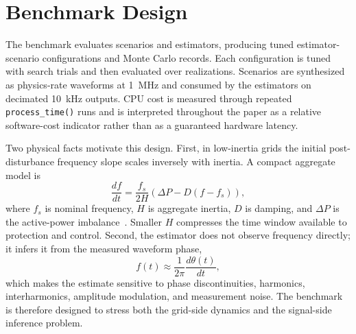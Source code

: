 \section{Benchmark Design}
\label{sec:benchmark_scope}

The benchmark evaluates \ArchivalScenarioCount{} scenarios and \ArchivalEstimatorCount{} estimators, producing \ArchivalPairCount{} tuned estimator-scenario configurations and \ArchivalTotalRecords{} Monte Carlo records. Each configuration is tuned with \ArchivalTuningTrials{} search trials and then evaluated over \ArchivalMonteCarloRuns{} realizations. Scenarios are synthesized as physics-rate waveforms at \SI{1}{MHz} and consumed by the estimators on decimated \SI{10}{kHz} outputs. CPU cost is measured through repeated \texttt{process\_time()} runs and is interpreted throughout the paper as a relative software-cost indicator rather than as a guaranteed hardware latency.

Two physical facts motivate this design. First, in low-inertia grids the initial post-disturbance frequency slope scales inversely with inertia. A compact aggregate model is
\begin{equation}
\frac{df}{dt} = \frac{f_s}{2H}\left(\Delta P - D\left(f-f_s\right)\right),
\label{eq:swing_compact}
\end{equation}
where $f_s$ is nominal frequency, $H$ is aggregate inertia, $D$ is damping, and $\Delta P$ is the active-power imbalance~\cite{Milano2018LowInertia}. Smaller $H$ compresses the time window available to protection and control. Second, the estimator does not observe frequency directly; it infers it from the measured waveform phase,
\begin{equation}
f(t) \approx \frac{1}{2\pi}\frac{d\theta(t)}{dt},
\label{eq:phase_to_frequency}
\end{equation}
which makes the estimate sensitive to phase discontinuities, harmonics, interharmonics, amplitude modulation, and measurement noise. The benchmark is therefore designed to stress both the grid-side dynamics and the signal-side inference problem.

